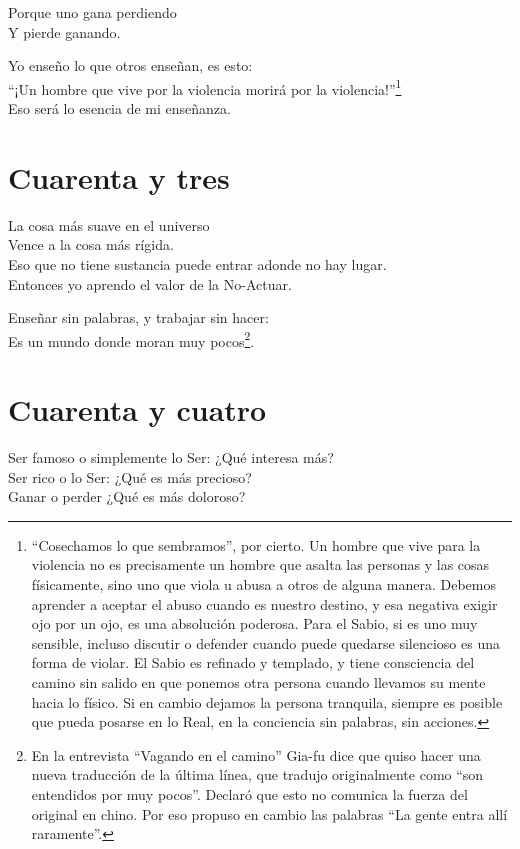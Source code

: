 \documentclass[hidelinks]{memoir}
\begin{document}
	Porque uno gana perdiendo\\
	Y pierde ganando.
	
	Yo enseño lo que otros enseñan, es esto:\\
	``¡Un hombre que vive por la violencia morirá por la violencia!''\footnote{``Cosechamos lo que sembramos'', por cierto. Un hombre que vive para la
		violencia no es precisamente un hombre que asalta las personas y las
		cosas físicamente, sino uno que viola u abusa a otros de alguna manera.
		Debemos aprender a aceptar el abuso cuando es nuestro destino, y esa
		negativa exigir ojo por un ojo, es una absolución poderosa. Para el
		Sabio, si es uno muy sensible, incluso discutir o defender cuando puede
		quedarse silencioso es una forma de violar. El Sabio es refinado y
		templado, y tiene consciencia del camino sin salido en que ponemos otra
		persona cuando llevamos su mente hacia lo físico. Si en cambio dejamos
		la persona tranquila, siempre es posible que pueda posarse en lo Real,
		en la conciencia sin palabras, sin acciones.}\\
	Eso será lo esencia de mi enseñanza.
	
	\chapter*{Cuarenta y tres}
	
	La cosa más suave en el universo\\
	Vence a la cosa más rígida.\\
	Eso que no tiene sustancia puede entrar adonde no hay lugar.\\
	Entonces yo aprendo el valor de la No-Actuar.
	
	Enseñar sin palabras, y trabajar sin hacer:\\
	Es un mundo donde moran muy pocos\footnote{En la entrevista ``Vagando en el camino'' Gia-fu dice que quiso hacer
		una nueva traducción de la última línea, que tradujo originalmente como
		``son entendidos por muy pocos''. Declaró que esto no comunica la fuerza
		del original en chino. Por eso propuso en cambio las palabras ``La gente
		entra allí raramente''.}.
	
	\chapter*{Cuarenta y cuatro}
	
	Ser famoso o simplemente lo Ser: ¿Qué interesa más?\\
	Ser rico o lo Ser: ¿Qué es más precioso?\\
	Ganar o perder ¿Qué es más doloroso?
	
\end{document}
